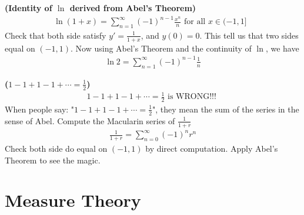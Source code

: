 \documentclass{report}
\begin{document}
\begin{mdframed}
\begin{Example}{\textbf{(Identity of $\ln$ derived from Abel's Theorem)}}{}
\begin{align*}
  \ln (1+x)=\sum_{n=1}^{\infty} (-1)^{n-1} \frac{x^n}{n}\text{ for all $x \in (-1,1]$ }
\end{align*}
Check that both side satisfy $y'=\frac{1}{1+x}$, and $y(0)=0$. This tell us that two sides equal on  $(-1,1)$. Now using Abel's Theorem and the continuity of $\ln$, we have 
\begin{align*}
\ln 2= \sum_{n=1}^{\infty} (-1)^{n-1} \frac{1}{n}
\end{align*}
\end{Example}
\begin{Example}{\textbf{($1-1+1-1+\cdots=\frac{1}{2}$)}}{}
\begin{align*}
1-1+1-1+\cdots = \frac{1}{2}\text{ is WRONG!!! }
\end{align*}
When people say: "$1-1+1-1+\cdots =\frac{1}{2}$", they mean the sum of the series in the sense of Abel. Compute the Macularin series of $\frac{1}{1+r}$
\begin{align*}
\frac{1}{1+r}=\sum_{n=0}^{\infty}(-1)^nr^n
\end{align*}
Check both side do equal on $(-1,1)$ by direct computation. Apply Abel's Theorem to see the magic. 
\end{Example}
\end{mdframed}

\chapter{Measure Theory}
\end{document}
